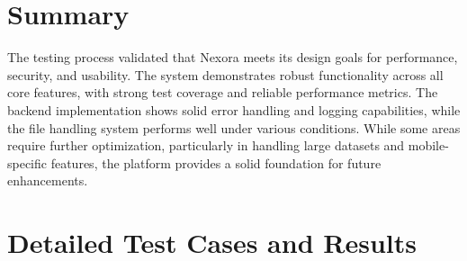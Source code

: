 \section{Summary}
The testing process validated that Nexora meets its design goals for performance, security, and usability. The system demonstrates robust functionality across all core features, with strong test coverage and reliable performance metrics. The backend implementation shows solid error handling and logging capabilities, while the file handling system performs well under various conditions. While some areas require further optimization, particularly in handling large datasets and mobile-specific features, the platform provides a solid foundation for future enhancements.

\section{Detailed Test Cases and Results}
